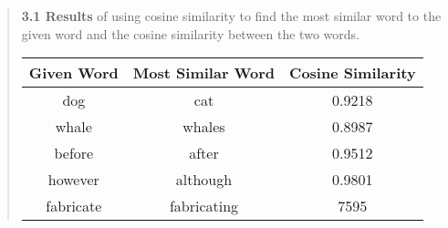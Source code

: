 \begin{quote}
    {\bf 3.1 Results} of using cosine similarity to find the most similar word to the given word and the cosine similarity between the two words.
	\begin{center}
	    \begin{tabular}{ c | c | c }
		Given Word & Most Similar Word & Cosine Similarity \\ 
		\hline
		dog & cat & 0.9218 \\
		whale & whales & 0.8987 \\
		before & after & 0.9512 \\
		however & although & 0.9801 \\
		fabricate & fabricating & 7595
	    \end{tabular}
	\end{center}	
\end{quote}
